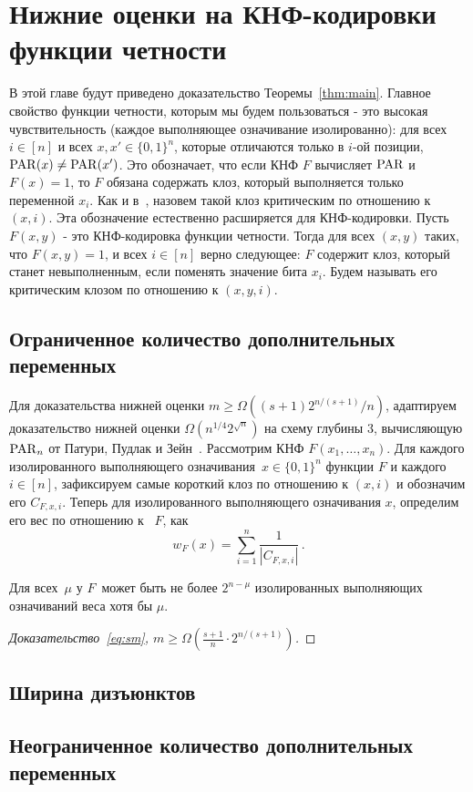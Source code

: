 \section{Нижние оценки на КНФ-кодировки функции четности}
В этой главе будут приведено доказательство Теоремы~\ref{thm:main}.
Главное свойство функции четности, которым мы будем пользоваться - это высокая чувствительность 
(каждое выполняющее означивание изолированно):
для всех $i \in [n]$ и всех $x,x' \in \{0,1\}^n$, которые отличаются только в $i$-ой позиции,
$\operatorname{PAR}(x) \neq \operatorname{PAR}(x')$.
Это обозначает, что если КНФ $F$ вычисляет $\operatorname{PAR}$ и $F(x) = 1$, то $F$ обязана содержать клоз, 
который выполняется только переменной $x_i$.
Как и в~\cite{DBLP:journals/cjtcs/PaturiPZ99}, назовем такой клоз критическим по отношению к $(x,i)$.
Эта обозначение естественно расширяется для КНФ-кодировки. Пусть $F(x, y)$ - это КНФ-кодировка функции четности.
Тогда для всех $(x, y)$ таких, что $F(x, y) = 1$, и всех $i \in [n]$ верно следующее: $F$ содержит клоз,
который станет невыполненным, если поменять значение бита $x_i$. 
Будем называть его критическим клозом по отношению к $(x, y, i)$.
\subsection{Ограниченное количество дополнительных переменных}
Для доказательства нижней оценки $m \ge \Omega((s+1)2^{n/(s+1)}/n)$, адаптируем доказательство нижней оценки $\Omega(n^{1/4}2^{\sqrt n})$ на схему глубины $3$, вычисляющую $\operatorname{PAR}_n$ 
от Патури, Пудлак и Зейн~\cite{DBLP:journals/cjtcs/PaturiPZ99}. 
Рассмотрим КНФ $F(x_1, \dotsc, x_n)$.
Для каждого изолированного выполняющего означивания~$x \in \{0,1\}^n$ функции $F$ и каждого~$i \in [n]$, зафиксируем самые короткий клоз по отношению к $(x,i)$ и обозначим его $C_{F,x,i}$.
Теперь для изолированного выполняющего означивания $x$, определим его вес по отношению к ~$F$, как 
\[w_F(x) = \sum\limits_{i=1}^n \frac{1}{|C_{F,x,i}|} \, .\]

\begin{lemma}\label{lemma:isolatedweight}
	Для всех~$\mu$ у $F$~может быть не более $2^{n - \mu}$ изолированных выполняющих означиваний 
	веса хотя бы $\mu$.
\end{lemma}

\begin{proof}[Доказательство~\eqref{eq:sm}, $m \ge \Omega\left(\frac{s+1}{n} \cdot 2^{n/(s+1)}\right)$]
	
\end{proof}
\subsection{Ширина дизъюнктов}
\subsection{Неограниченное количество дополнительных переменных}